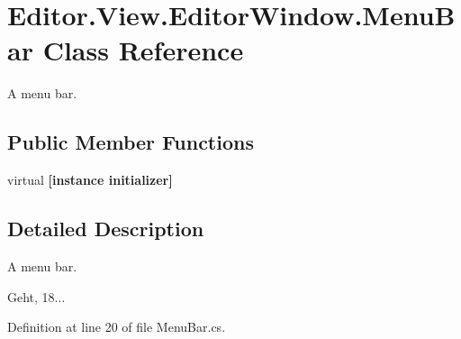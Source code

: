 \section{Editor.\-View.\-Editor\-Window.\-Menu\-Bar Class Reference}
\label{class_editor_1_1_view_1_1_editor_window_1_1_menu_bar}


A menu bar.  


\subsection*{Public Member Functions}
\begin{DoxyCompactItemize}
\item 
virtual {\bfseries [instance initializer]}\label{class_editor_1_1_view_1_1_editor_window_1_1_menu_bar_acef74fbbac202deb00c0ced106dd0ce7}

\end{DoxyCompactItemize}


\subsection{Detailed Description}
A menu bar. 

Geht, 18... 

Definition at line 20 of file Menu\-Bar.\-cs.

